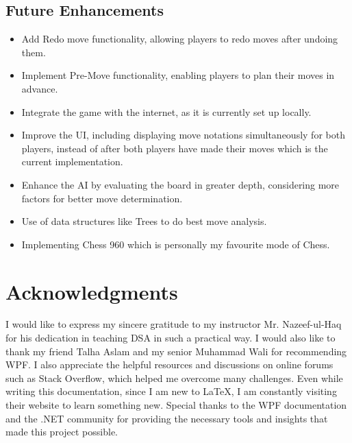 \documentclass[a4paper,12pt]{article}
\begin{document}
\subsection{Future Enhancements}
\begin{itemize}
    \item Add Redo move functionality, allowing players to redo moves after undoing them.
    \item Implement Pre-Move functionality, enabling players to plan their moves in advance.
    \item Integrate the game with the internet, as it is currently set up locally.
    \item Improve the UI, including displaying move notations simultaneously for both players, instead of after both players have made their moves which is the current implementation.
    \item Enhance the AI by evaluating the board in greater depth, considering more factors for better move determination.
    \item Use of data structures like Trees to do best move analysis.
    \item Implementing Chess 960 which is personally my favourite mode of Chess.
\end{itemize}

\section{Acknowledgments}
I would like to express my sincere gratitude to my instructor Mr. Nazeef-ul-Haq for his dedication in teaching DSA in such a practical way. I would also like to thank my friend Talha Aslam and my senior Muhammad Wali for recommending WPF. I also appreciate the helpful resources and discussions on online forums such as Stack Overflow, which helped me overcome many challenges. Even while writing this documentation, since I am new to LaTeX, I am constantly visiting their website to learn something new. Special thanks to the WPF documentation and the .NET community for providing the necessary tools and insights that made this project possible.
\end{document}
